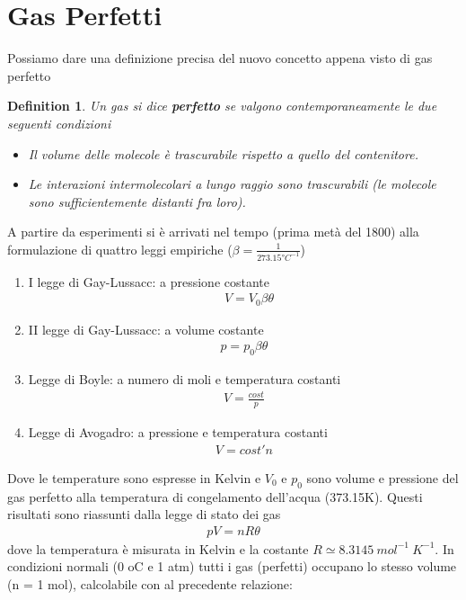 \documentclass[10pt,a4paper]{article}
\newtheorem{definition}{Definition}
\begin{document}
\section{Gas Perfetti}
Possiamo dare una definizione precisa del nuovo concetto appena visto di gas perfetto
\begin{definition}
Un gas si dice \textbf{perfetto} se valgono contemporaneamente le due seguenti condizioni
\begin{itemize}
\item Il volume delle molecole è trascurabile rispetto a quello del contenitore.
\item Le interazioni intermolecolari a lungo raggio sono trascurabili (le molecole sono sufficientemente distanti fra loro). 
\end{itemize}
\end{definition}
A partire da esperimenti si è arrivati nel tempo (prima metà del 1800) alla formulazione di quattro leggi empiriche ($\beta = \frac{1}{273.15 °C^{-1}}$)
\begin{enumerate}
\item I legge di Gay-Lussacc: a pressione costante
 \begin{align*} 
 &V = V_0 \beta \theta
\end{align*} 
\item II legge di Gay-Lussacc: a volume costante
\begin{align*} 
	p = p_0 \beta \theta
\end{align*} 
\item Legge di Boyle: a numero di moli e temperatura costanti
\begin{align*} 
 V = \frac{cost}{p}
\end{align*} 
\item Legge di Avogadro: a pressione e temperatura costanti
\begin{align*} 
	V = cost' n
\end{align*} 
\end{enumerate}
Dove le temperature sono espresse in Kelvin e $V_0$ e $p_0$ sono volume e pressione del gas perfetto alla temperatura di congelamento dell'acqua (373.15\textdegree K). Questi risultati sono riassunti dalla legge di stato dei gas
\begin{align}\label{eq:gaseperfetti}
	pV = nR\theta
\end{align} 
dove la temperatura è misurata in Kelvin e la costante $R\simeq 8.3145\ mol^{-1}\ K^{-1}$. In condizioni normali (0 oC e 1 atm) tutti i gas (perfetti) occupano lo stesso volume (n = 1 mol), calcolabile con al precedente relazione:
\end{document}
